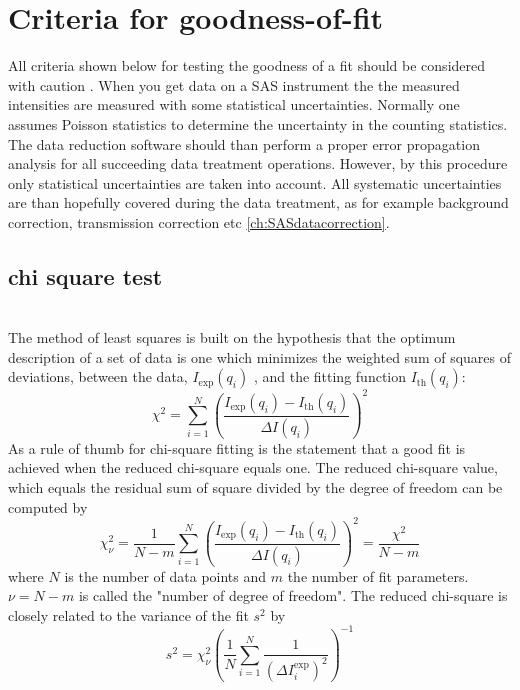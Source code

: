 
\clearpage
\section{Criteria for goodness-of-fit}
All criteria shown below for testing the goodness of a fit should be
considered with caution \cite{Bevington2003,Press2007}.
When you get data on a SAS instrument the
the measured intensities are measured with some statistical uncertainties.
Normally one assumes Poisson statistics to determine the uncertainty
in the counting statistics. The data reduction software should than perform a
proper error propagation analysis for all succeeding data treatment operations.
However, by this procedure only statistical uncertainties are taken into account.
All systematic uncertainties are than hopefully covered during the data treatment,
as for example background correction, transmission correction etc \ref{ch:SASdatacorrection}.
~\\
\subsection{chi square test}
~\\
The method of least squares is built on the hypothesis that the
optimum description of a set of data is one which minimizes the
weighted sum of squares of deviations, between the data,
$I_\text{exp}(q_i)$ , and the fitting function $I_\text{th}(q_i)$:
\begin{equation}
\chi^2 = \displaystyle\sum_{i=1}^N
\left(\frac{I_\text{exp}(q_i)-I_\text{th}(q_i)}{\Delta
I(q_i)}\right)^2
\label{eq:chi2}
\end{equation}
As a rule of thumb for chi-square fitting is the statement that a
good fit is achieved when the reduced chi-square equals one. The
reduced chi-square value, which equals the residual sum of square
divided by the degree of freedom can be computed by
\begin{equation}
\chi^2_\nu = \displaystyle \frac{1}{N-m} \sum_{i=1}^N
\left(\frac{I_\text{exp}(q_i)-I_\text{th}(q_i)}{\Delta
I(q_i)}\right)^2 = \frac{\chi^2}{N-m}
\end{equation}
where $N$ is the number of data points and $m$ the number of fit parameters.
$\nu=N-m$ is called the "number of degree of freedom". The reduced chi-square
is closely related to the variance of the fit $s^2$ by
\begin{equation}
s^2=\chi_\nu^2 \left( \frac{1}{N}\sum_{i=1}^N \frac{1}{\left(\Delta I_i^\text{exp}\right)^2}\right)^{-1}
\end{equation}

